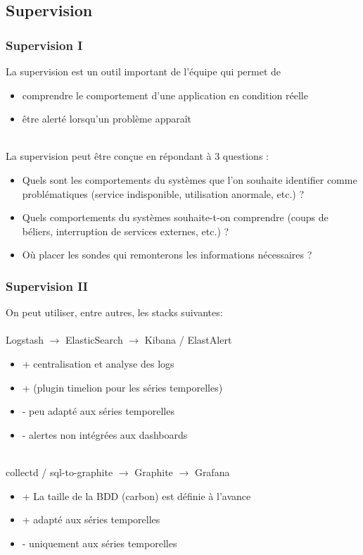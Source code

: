 \subsection{Supervision}
\begin{frame}
	\frametitle{Supervision I}
La supervision est un outil important de l'\'{e}quipe qui permet de
	\begin{itemize}
        \item comprendre le comportement d'une application en condition r\'{e}elle
        \item \^{e}tre alert\'{e} lorsqu'un probl\`{e}me appara\^{i}t
    \end{itemize}

    ~\\
    La supervision peut \^{e}tre con\c{c}ue en r\'{e}pondant \`{a} 3 questions :
    \begin{itemize}
    	\item Quels sont les comportements du syst\`{e}mes que l'on souhaite identifier comme probl\'{e}matiques (service indisponible, utilisation anormale, etc.) ?
        \item Quels comportements du syst\`{e}mes souhaite-t-on comprendre (coups de b\'{e}liers, interruption de services externes, etc.) ?
        \item O\`{u} placer les sondes qui remonterons les informations n\'{e}cessaires ?
    \end{itemize}
\end{frame}

\begin{frame}[fragile]
	\frametitle{Supervision II}
    On peut utiliser, entre autres, les stacks suivantes:
    \\~\\
    Logstash $\longrightarrow$ ElasticSearch $\longrightarrow$ Kibana / ElastAlert
    \begin{itemize}
      \item[] + centralisation et analyse des logs
      \item[] + (plugin timelion pour les s\'{e}ries temporelles)
      \item[] - peu adapt\'{e} aux s\'{e}ries temporelles
      \item[] - alertes non int\'{e}gr\'{e}es aux dashboards
    \end{itemize}
    ~\\
    collectd / sql-to-graphite $\longrightarrow$ Graphite $\longrightarrow$ Grafana
	\begin{itemize}
      \item[] + La taille de la BDD (carbon) est d\'{e}finie \`{a} l'avance
      \item[] + adapt\'{e} aux s\'{e}ries temporelles
      \item[] - uniquement aux s\'{e}ries temporelles
    \end{itemize}
\end{frame}

